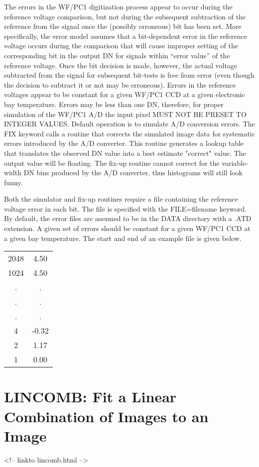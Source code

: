 The errors in the WF/PC1 digitization process appear to occur during the
reference voltage comparison, but not during the subsequent subtraction of
the reference from the signal once the (possibly erroneous) bit has been
set.  More specifically, the error model assumes that a bit-dependent error
in the reference voltage occurs during the comparison that will cause
improper setting of the corresponding bit in the output DN for signals
within ``error value'' of the reference voltage.  Once the bit decision is
made, however, the actual voltage subtracted from the signal for subsequent
bit-tests is free from error (even though the decision to subtract it or
not may be erroneous).  Errors in the reference voltages appear to be
constant for a given WF/PC1 CCD at a given electronic bay temperature.
Errors may be less than one DN, therefore, for proper simulation of the
WF/PC1 A/D the input pixel MUST NOT BE PRESET TO INTEGER VALUES.  Default
operation is to simulate A/D conversion errors.  The FIX keyword calls a
routine that corrects the simulated image data for systematic errors
introduced by the A/D converter.  This routine generates a lookup table
that translates the observed DN value into a best estimate "correct" value.
The output value will be floating.  The fix-up routine cannot correct for
the variable-width DN bins produced by the A/D converter, thus histograms
will still look funny.

Both the simulator and fix-up routines require a file containing the
reference voltage error in each bit.  The file is specified with the
FILE=filename keyword.  By default, the error files are assumed to be in
the DATA directory with a .ATD extension.  A given set of errors should be
constant for a given WF/PC1 CCD at a given bay temperature.  The start and
end of an example file is given below.

\begin{tabular}{cc} 
2048&4.50\\
1024&4.50\\
   .& .\\
   .& .\\
   .& .\\
   4&-0.32\\
   2&1.17\\
   1&0.00\\
\end{tabular}

\section{LINCOMB: Fit a Linear Combination of Images to an Image}
\begin{rawhtml}
<!-- linkto lincomb.html -->
\end{rawhtml}

